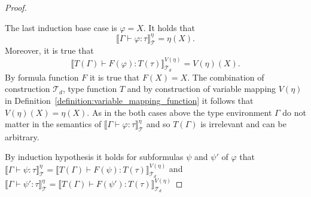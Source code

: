 \begin{proof}
\begin{compactitem}
        \item The last induction base case is $\varphi = X$. It holds that
        \[\llbracket \Gamma \vdash \varphi \colon \tau \rrbracket^\eta_\mathcal{T} = \eta(X).\]
        Moreover, it is true that
        \[\llbracket T(\Gamma) \vdash F(\varphi) \colon T(\tau) \rrbracket^{V(\eta)}_{\mathcal{T}_d} = V(\eta)(X).\]
        By formula function $F$ it is true that $F(X) = X$. The combination of construction $\mathcal{T}_d$, type
        function $T$ and by construction of variable mapping $V(\eta)$ in
        Definition~\ref{definition:variable_mapping_function} it follows that $V(\eta)(X) = \eta(X)$. As in the both
        cases above the type environment $\Gamma$ do not matter in the semantics of $\llbracket \Gamma \vdash \varphi
        \colon \tau \rrbracket^\eta_\mathcal{T}$ and so $T(\Gamma)$ is irrelevant and can be arbitrary.
    \end{compactitem}
    By induction hypothesis it holds for subformulas $\psi$ and $\psi'$ of $\varphi$ that $\llbracket \Gamma \vdash
    \psi \colon \tau \rrbracket^\eta_\mathcal{T} = \llbracket T(\Gamma) \vdash F(\psi) \colon T(\tau)
    \rrbracket^{V(\eta)}_{\mathcal{T}_d}$ and $\llbracket \Gamma \vdash
    \psi' \colon \tau \rrbracket^\eta_\mathcal{T} = \llbracket T(\Gamma) \vdash F(\psi') \colon T(\tau)
    \rrbracket^{V(\eta)}_{\mathcal{T}_d}$
\end{proof}
